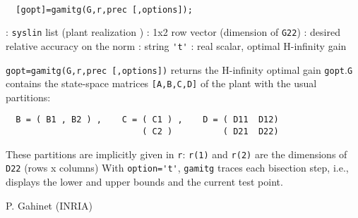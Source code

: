 \begin{mandesc}
   \\ %
\end{mandesc}
\begin{calling_sequence}
\begin{verbatim}
  [gopt]=gamitg(G,r,prec [,options]);  
\end{verbatim}
\end{calling_sequence}
\begin{parameters}
  \begin{varlist}
    : \verb!syslin! list (plant realization )
    : 1x2 row vector (dimension of \verb!G22!)
    : desired relative accuracy on the norm
    : string \verb!'t'!
    : real scalar, optimal H-infinity gain
  \end{varlist}
\end{parameters}
\begin{mandescription}
  \verb!gopt=gamitg(G,r,prec [,options])!
  returns the H-infinity optimal gain \verb!gopt!.\verb!G! contains the state-space matrices \verb![A,B,C,D]! of
  the plant with the usual partitions:
\begin{verbatim}
  B = ( B1 , B2 ) ,    C = ( C1 ) ,    D = ( D11  D12)
                           ( C2 )          ( D21  D22)
\end{verbatim}
  These partitions are implicitly given in \verb!r!: \verb!r(1)!
  and \verb!r(2)! are the dimensions of \verb!D22! (rows x columns)
  With \verb!option='t'!, \verb!gamitg! traces each bisection step, i.e., 
  displays the lower and upper bounds and the current test point.
\end{mandescription}
\begin{manseealso}
     
\end{manseealso}
\begin{authors}
  P. Gahinet  (INRIA)
\end{authors}
